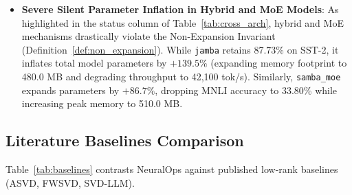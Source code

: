 \documentclass{article}
\begin{document}
\begin{itemize}
    \item \textbf{Severe Silent Parameter Inflation in Hybrid and MoE Models}: As highlighted in the status column of Table~\ref{tab:cross_arch}, hybrid and MoE mechanisms drastically violate the Non-Expansion Invariant (Definition~\ref{def:non_expansion}). While \texttt{jamba} retains 87.73\% on SST-2, it inflates total model parameters by $+139.5\%$ (expanding memory footprint to 480.0 MB and degrading throughput to 42,100 tok/s). Similarly, \texttt{samba\_moe} expands parameters by $+86.7\%$, dropping MNLI accuracy to 33.80\% while increasing peak memory to 510.0 MB.
\end{itemize}

\subsection{Literature Baselines Comparison}
Table~\ref{tab:baselines} contrasts NeuralOps against published low-rank baselines (ASVD, FWSVD, SVD-LLM).


\end{document}
